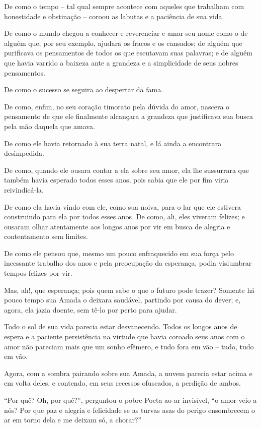 De como o tempo -- tal qual sempre acontece com aqueles que trabalham
com honestidade e obstinação -- coroou as labutas e a paciência de sua
vida.

De como o mundo chegou a conhecer e reverenciar e amar seu nome como o
de alguém que, por seu exemplo, ajudara os fracos e os cansados; de
alguém que purificava os pensamentos de todos os que escutavam suas
palavras; e de alguém que havia varrido a baixeza ante a grandeza e a
simplicidade de seus nobres pensamentos.

De como o sucesso se seguira ao despertar da fama.

De como, enfim, no seu coração timorato pela dúvida do amor, nascera o
pensamento de que ele finalmente alcançara a grandeza que justificava
sua busca pela mão daquela que amava.

De como ele havia retornado à sua terra natal, e lá ainda a encontrara
desimpedida.

De como, quando ele ousara contar a ela sobre seu amor, ela lhe
sussurrara que também havia esperado todos esses anos, pois sabia que
ele por fim viria reivindicá-la.

De como ela havia vindo com ele, como sua noiva, para o lar que ele
estivera construindo para ela por todos esses anos. De como, ali, eles
viveram felizes; e ousaram olhar atentamente aos longos anos por vir em
busca de alegria e contentamento sem limites.

De como ele pensou que, mesmo um pouco enfraquecido em sua força pelo
incessante trabalho dos anos e pela preocupação da esperança, podia
vislumbrar tempos felizes por vir.

Mas, ah!, que esperança; pois quem sabe o que o futuro pode trazer?
Somente há pouco tempo sua Amada o deixara saudável, partindo por causa
do dever; e, agora, ela jazia doente, sem tê-lo por perto para ajudar.

Todo o sol de sua vida parecia estar desvanecendo. Todos os longos anos
de espera e a paciente persistência na virtude que havia coroado seus
anos com o amor não pareciam mais que um sonho efêmero, e tudo fora em
vão -- tudo, tudo em vão.

Agora, com a sombra pairando sobre sua Amada, a nuvem parecia estar
acima e em volta deles, e contendo, em seus recessos ofuscados, a
perdição de ambos.

``Por quê? Oh, por quê?'', perguntou o pobre Poeta ao ar invisível, ``o
amor veio a nós? Por que paz e alegria e felicidade se as turvas asas do
perigo ensombrecem o ar em torno dela e me deixam só, a chorar?''

